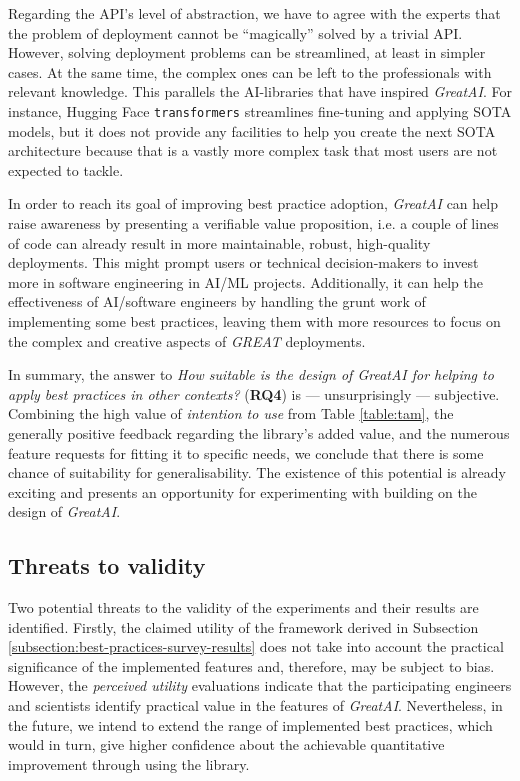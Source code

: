Regarding the API's level of abstraction, we have to agree with the experts that the problem of deployment cannot be ``magically'' solved by a trivial API. However, solving deployment problems can be streamlined, at least in simpler cases. At the same time, the complex ones can be left to the professionals with relevant knowledge. This parallels the AI-libraries that have inspired \textit{GreatAI}. For instance, Hugging Face \texttt{transformers} streamlines fine-tuning and applying SOTA models, but it does not provide any facilities to help you create the next SOTA architecture because that is a vastly more complex task that most users are not expected to tackle.

In order to reach its goal of improving best practice adoption, \textit{GreatAI} can help raise awareness by presenting a verifiable value proposition, i.e. a couple of lines of code can already result in more maintainable, robust, high-quality deployments. This might prompt users or technical decision-makers to invest more in software engineering in AI/ML projects. Additionally, it can help the effectiveness of AI/software engineers by handling the grunt work of implementing some best practices, leaving them with more resources to focus on the complex and creative aspects of \textit{GREAT} deployments.
  
In summary, the answer to \textit{How suitable is the design of GreatAI for helping to apply best practices in other contexts?} (\textbf{RQ4}) is --- unsurprisingly --- subjective. Combining the high value of \textit{intention to use} from Table \ref{table:tam}, the generally positive feedback regarding the library's added value, and the numerous feature requests for fitting it to specific needs, we conclude that there is some chance of suitability for generalisability. The existence of this potential is already exciting and presents an opportunity for experimenting with building on the design of \textit{GreatAI}.

\subsection{Threats to validity}

Two potential threats to the validity of the experiments and their results are identified. Firstly, the claimed utility of the framework derived in Subsection \ref{subsection:best-practices-survey-results} does not take into account the practical significance of the implemented features and, therefore, may be subject to bias. However, the \textit{perceived utility} evaluations indicate that the participating engineers and scientists identify practical value in the features of \textit{GreatAI}. Nevertheless, in the future, we intend to extend the range of implemented best practices, which would in turn, give higher confidence about the achievable quantitative improvement through using the library.

